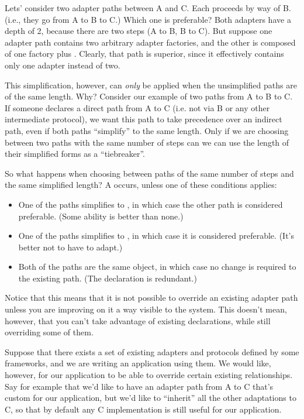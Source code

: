 \begin{verbatim%
}
\begin{verbatim%
}
\begin{verbatim%
}
\begin{verbatim%
}
Lets' consider two adapter paths between A and C.  Each proceeds by way of B.
(i.e., they go from A to B to C.)  Which one is preferable?  Both
adapters have a depth of 2, because there are two steps (A to B, B to C).  But
suppose one adapter path contains two arbitrary adapter factories, and the
other is composed of one factory plus .  Clearly,
that path is superior, since it effectively contains only one adapter instead
of two.

This simplification, however, can \emph{only} be applied when the unsimplified
paths are of the same length.  Why?  Consider our example of two paths from A
to B to C.  If someone declares a direct path from A to C (i.e. not via B or
any other intermediate protocol), we want this path to take precedence over an
indirect path, even if both paths ``simplify'' to the same length.  Only if we
are choosing between two paths with the same number of steps can we can use the
length of their simplified forms as a ``tiebreaker''.

So what happens when choosing between paths of the same number of steps and the
same simplified length?  A  occurs, unless one of these
conditions applies:

\begin{itemize}
\item One of the paths simplifies to , in which case
the other path is considered preferable.  (Some ability is better than none.)

\item One of the paths simplifies to , in which
case it is considered preferable.  (It's better not to have to adapt.)

\item Both of the paths are the same object, in which case no change is
required to the existing path.  (The declaration is redundant.)
\end{itemize}

Notice that this means that it is not possible to override an existing adapter
path unless you are improving on it a way visible to the system.  This doesn't
mean, however, that you can't take advantage of existing declarations, while
still overriding some of them.

Suppose that there exists a set of existing adapters and protocols defined by
some frameworks, and we are writing an application using them.  We would like,
however, for our application to be able to override certain existing
relationships.  Say for example that we'd like to have an adapter path from A
to C that's custom for our application, but we'd like to ``inherit'' all the
other adaptations to C, so that by default any C implementation is still useful
for our application.


\end{verbatim%
}
\end{verbatim%
}
\end{verbatim%
}
\end{verbatim%
}
